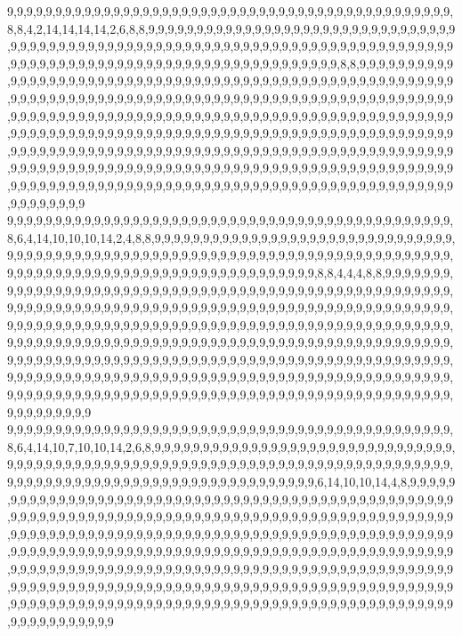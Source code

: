 9,9,9,9,9,9,9,9,9,9,9,9,9,9,9,9,9,9,9,9,9,9,9,9,9,9,9,9,9,9,9,9,9,9,9,9,9,9,9,9,9,9,9,9,9,9,8,8,4,2,14,14,14,14,2,6,8,8,9,9,9,9,9,9,9,9,9,9,9,9,9,9,9,9,9,9,9,9,9,9,9,9,9,9,9,9,9,9,9,9,9,9,9,9,9,9,9,9,9,9,9,9,9,9,9,9,9,9,9,9,9,9,9,9,9,9,9,9,9,9,9,9,9,9,9,9,9,9,9,9,9,9,9,9,9,9,9,9,9,9,9,9,9,9,9,9,9,9,9,9,9,9,9,9,9,9,9,9,9,9,9,9,9,9,9,9,9,9,9,9,8,8,9,9,9,9,9,9,9,9,9,9,9,9,9,9,9,9,9,9,9,9,9,9,9,9,9,9,9,9,9,9,9,9,9,9,9,9,9,9,9,9,9,9,9,9,9,9,9,9,9,9,9,9,9,9,9,9,9,9,9,9,9,9,9,9,9,9,9,9,9,9,9,9,9,9,9,9,9,9,9,9,9,9,9,9,9,9,9,9,9,9,9,9,9,9,9,9,9,9,9,9,9,9,9,9,9,9,9,9,9,9,9,9,9,9,9,9,9,9,9,9,9,9,9,9,9,9,9,9,9,9,9,9,9,9,9,9,9,9,9,9,9,9,9,9,9,9,9,9,9,9,9,9,9,9,9,9,9,9,9,9,9,9,9,9,9,9,9,9,9,9,9,9,9,9,9,9,9,9,9,9,9,9,9,9,9,9,9,9,9,9,9,9,9,9,9,9,9,9,9,9,9,9,9,9,9,9,9,9,9,9,9,9,9,9,9,9,9,9,9,9,9,9,9,9,9,9,9,9,9,9,9,9,9,9,9,9,9,9,9,9,9,9,9,9,9,9,9,9,9,9,9,9,9,9,9,9,9,9,9,9,9,9,9,9,9,9,9,9,9,9,9,9,9,9,9,9,9,9,9,9,9,9,9,9,9,9,9,9,9,9,9,9,9,9,9,9,9,9,9,9,9,9,9,9,9,9,9,9,9,9,9,9,9,9,9,9,9,9,9,9,9,9,9,9,9,9,9,9,9,9,9,9,9,9,9,9,9,9,9,9
9,9,9,9,9,9,9,9,9,9,9,9,9,9,9,9,9,9,9,9,9,9,9,9,9,9,9,9,9,9,9,9,9,9,9,9,9,9,9,9,9,9,9,9,9,9,8,6,4,14,10,10,10,14,2,4,8,8,9,9,9,9,9,9,9,9,9,9,9,9,9,9,9,9,9,9,9,9,9,9,9,9,9,9,9,9,9,9,9,9,9,9,9,9,9,9,9,9,9,9,9,9,9,9,9,9,9,9,9,9,9,9,9,9,9,9,9,9,9,9,9,9,9,9,9,9,9,9,9,9,9,9,9,9,9,9,9,9,9,9,9,9,9,9,9,9,9,9,9,9,9,9,9,9,9,9,9,9,9,9,9,9,9,9,9,9,9,8,8,4,4,4,8,8,9,9,9,9,9,9,9,9,9,9,9,9,9,9,9,9,9,9,9,9,9,9,9,9,9,9,9,9,9,9,9,9,9,9,9,9,9,9,9,9,9,9,9,9,9,9,9,9,9,9,9,9,9,9,9,9,9,9,9,9,9,9,9,9,9,9,9,9,9,9,9,9,9,9,9,9,9,9,9,9,9,9,9,9,9,9,9,9,9,9,9,9,9,9,9,9,9,9,9,9,9,9,9,9,9,9,9,9,9,9,9,9,9,9,9,9,9,9,9,9,9,9,9,9,9,9,9,9,9,9,9,9,9,9,9,9,9,9,9,9,9,9,9,9,9,9,9,9,9,9,9,9,9,9,9,9,9,9,9,9,9,9,9,9,9,9,9,9,9,9,9,9,9,9,9,9,9,9,9,9,9,9,9,9,9,9,9,9,9,9,9,9,9,9,9,9,9,9,9,9,9,9,9,9,9,9,9,9,9,9,9,9,9,9,9,9,9,9,9,9,9,9,9,9,9,9,9,9,9,9,9,9,9,9,9,9,9,9,9,9,9,9,9,9,9,9,9,9,9,9,9,9,9,9,9,9,9,9,9,9,9,9,9,9,9,9,9,9,9,9,9,9,9,9,9,9,9,9,9,9,9,9,9,9,9,9,9,9,9,9,9,9,9,9,9,9,9,9,9,9,9,9,9,9,9,9,9,9,9,9,9,9,9,9,9,9,9,9,9,9,9,9,9,9,9,9,9,9,9,9,9,9,9,9,9,9,9,9
9,9,9,9,9,9,9,9,9,9,9,9,9,9,9,9,9,9,9,9,9,9,9,9,9,9,9,9,9,9,9,9,9,9,9,9,9,9,9,9,9,9,9,9,9,9,8,6,4,14,10,7,10,10,14,2,6,8,9,9,9,9,9,9,9,9,9,9,9,9,9,9,9,9,9,9,9,9,9,9,9,9,9,9,9,9,9,9,9,9,9,9,9,9,9,9,9,9,9,9,9,9,9,9,9,9,9,9,9,9,9,9,9,9,9,9,9,9,9,9,9,9,9,9,9,9,9,9,9,9,9,9,9,9,9,9,9,9,9,9,9,9,9,9,9,9,9,9,9,9,9,9,9,9,9,9,9,9,9,9,9,9,9,9,9,9,9,6,14,10,10,14,4,8,9,9,9,9,9,9,9,9,9,9,9,9,9,9,9,9,9,9,9,9,9,9,9,9,9,9,9,9,9,9,9,9,9,9,9,9,9,9,9,9,9,9,9,9,9,9,9,9,9,9,9,9,9,9,9,9,9,9,9,9,9,9,9,9,9,9,9,9,9,9,9,9,9,9,9,9,9,9,9,9,9,9,9,9,9,9,9,9,9,9,9,9,9,9,9,9,9,9,9,9,9,9,9,9,9,9,9,9,9,9,9,9,9,9,9,9,9,9,9,9,9,9,9,9,9,9,9,9,9,9,9,9,9,9,9,9,9,9,9,9,9,9,9,9,9,9,9,9,9,9,9,9,9,9,9,9,9,9,9,9,9,9,9,9,9,9,9,9,9,9,9,9,9,9,9,9,9,9,9,9,9,9,9,9,9,9,9,9,9,9,9,9,9,9,9,9,9,9,9,9,9,9,9,9,9,9,9,9,9,9,9,9,9,9,9,9,9,9,9,9,9,9,9,9,9,9,9,9,9,9,9,9,9,9,9,9,9,9,9,9,9,9,9,9,9,9,9,9,9,9,9,9,9,9,9,9,9,9,9,9,9,9,9,9,9,9,9,9,9,9,9,9,9,9,9,9,9,9,9,9,9,9,9,9,9,9,9,9,9,9,9,9,9,9,9,9,9,9,9,9,9,9,9,9,9,9,9,9,9,9,9,9,9,9,9,9,9,9,9,9,9,9,9,9,9,9,9,9,9,9,9,9,9,9,9,9,9,9
